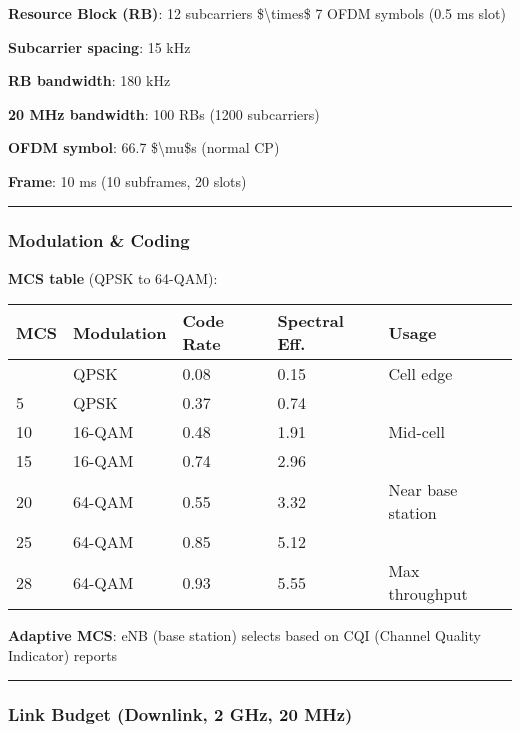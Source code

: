 \textbf{Resource Block (RB)}: 12 subcarriers \$\textbackslash times\$ 7
OFDM symbols (0.5 ms slot)

\textbf{Subcarrier spacing}: 15 kHz

\textbf{RB bandwidth}: 180 kHz

\textbf{20 MHz bandwidth}: 100 RBs (1200 subcarriers)

\textbf{OFDM symbol}: 66.7 \$\textbackslash mu\$s (normal CP)

\textbf{Frame}: 10 ms (10 subframes, 20 slots)

\begin{center}\rule{0.5\linewidth}{0.5pt}\end{center}

\subsubsection{Modulation \& Coding}\label{modulation-coding}

\textbf{MCS table} (QPSK to 64-QAM):

{\def\LTcaptype{} %
\begin{longtable}[]{@{}lllll@{}}
\toprule\noalign{}
MCS & Modulation & Code Rate & Spectral Eff. & Usage \\
\midrule\noalign{}
\endhead
\bottomrule\noalign{}
\endlastfoot
0 & QPSK & 0.08 & 0.15 & Cell edge \\
5 & QPSK & 0.37 & 0.74 & \\
10 & 16-QAM & 0.48 & 1.91 & Mid-cell \\
15 & 16-QAM & 0.74 & 2.96 & \\
20 & 64-QAM & 0.55 & 3.32 & Near base station \\
25 & 64-QAM & 0.85 & 5.12 & \\
28 & 64-QAM & 0.93 & 5.55 & Max throughput \\
\end{longtable}
}

\textbf{Adaptive MCS}: eNB (base station) selects based on CQI (Channel
Quality Indicator) reports

\begin{center}\rule{0.5\linewidth}{0.5pt}\end{center}

\subsubsection{Link Budget (Downlink, 2 GHz, 20
MHz)}\label{link-budget-downlink-2-ghz-20-mhz}

